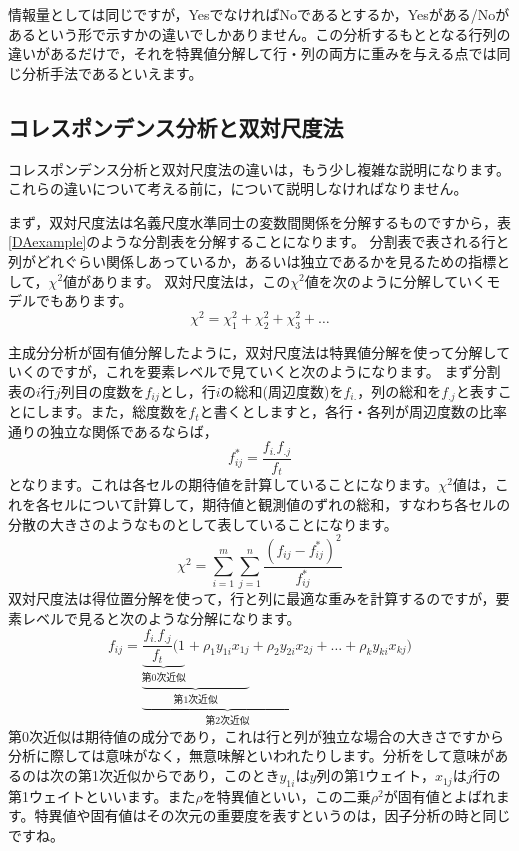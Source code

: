 \documentclass{ltjsbook}
\begin{document}
情報量としては同じですが，YesでなければNoであるとするか，Yesがある/Noがあるという形で示すかの違いでしかありません。この分析するもととなる行列の違いがあるだけで，それを特異値分解して行・列の両方に重みを与える点では同じ分析手法であるといえます。
\subsection{コレスポンデンス分析と双対尺度法}
コレスポンデンス分析と双対尺度法の違いは，もう少し複雑な説明になります。これらの違いについて考える前に，について説明しなければなりません。

まず，双対尺度法は名義尺度水準同士の変数間関係を分解するものですから，表\ref{DAexample}のような分割表を分解することになります。
分割表で表される行と列がどれぐらい関係しあっているか，あるいは独立であるかを見るための指標として，$\chi^2$値があります。
双対尺度法は，この$\chi^2$値を次のように分解していくモデルでもあります。
\begin{equation}
    \chi^{2}=\chi_{1}^{2}+\chi_{2}^{2}+\chi_{3}^{2}+\ldots
    \label{chi}
\end{equation}

主成分分析が固有値分解したように，双対尺度法は特異値分解を使って分解していくのですが，これを要素レベルで見ていくと次のようになります。
まず分割表の$i$行$j$列目の度数を$f_{ij}$とし，行$i$の総和(周辺度数)を$f_{i.}$，列の総和を$f_{.j}$と表すことにします。また，総度数を$f_t$と書くとしますと，各行・各列が周辺度数の比率通りの独立な関係であるならば，
\[ f^{\ast}_{ij} = \frac{f_{i.}f_{.j}}{f_t} \]
となります。これは各セルの期待値を計算していることになります。$\chi^2$値は，これを各セルについて計算して，期待値と観測値のずれの総和，すなわち各セルの分散の大きさのようなものとして表していることになります。
\[ \chi^2 = \sum_{i=1}^m \sum_{j=1}^n \frac{(f_{ij}-f^{\ast}_{ij})^2}{f^{\ast}_{ij}} \]
双対尺度法は得位置分解を使って，行と列に最適な重みを計算するのですが，要素レベルで見ると次のような分解になります。
\[    
    f_{ij}=\underbrace{\underbrace{\underbrace{\frac{f_{i.}f_{.j}}{f_{t}}( 1}_{第0次近似}+\rho_{1}y_{1i}x_{1j}}_{第1次近似}+\rho_{2}y_{2i}x_{2j}}_{第2次近似}+\ldots+\rho_{k}y_{ki}x_{kj})
\]
第0次近似は期待値の成分であり，これは行と列が独立な場合の大きさですから分析に際しては意味がなく，無意味解といわれたりします。分析をして意味があるのは次の第1次近似からであり，このとき$y_{1i}$は$y$列の第1ウェイト，$x_{1j}$は$j$行の第1ウェイトといいます。また$\rho$を特異値といい，この二乗$\rho^2$が固有値とよばれます。特異値や固有値はその次元の重要度を表すというのは，因子分析の時と同じですね。
\end{document}
